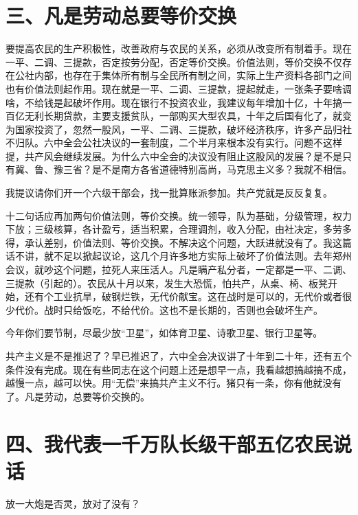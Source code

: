 \date{一九五九年三月一日}
\section{三、凡是劳动总要等价交换}

要提高农民的生产积极性，改善政府与农民的关系，必须从改变所有制着手。现在一平、二调、三提款，否定按劳分配，否定等价交换。价值法则，等价交换不仅存在公社内部，也存在于集体所有制与全民所有制之间，实际上生产资料各部门之间也有价值法则起作用。现在就是一平、二调、三提款，提起就走，一张条子要啥调啥，不给钱是起破坏作用。现在银行不投资农业，我建议每年增加十亿，十年搞一百亿无利长期贷款，主要支援贫队，一部购买大型农具，十年之后国有化了，就变为国家投资了，忽然一股风，一平、二调、三提款，破坏经济秩序，许多产品归社不归队。六中全会公社决议的一套制度，二个半月来根本没有实行。问题不这样提，共产风会继续发展。为什么六中全会的决议没有阻止这股风的发展？是不是只有冀、鲁、豫三省？是不是南方各省道德特别高尚，马克思主义多？我就不相信。

我提议请你们开一个六级干部会，找一批算账派参加。共产党就是反反复复。

十二句话应再加两句价值法则，等价交换。统一领导，队为基础，分级管理，权力下放；三级核算，各计盈亏，适当积累，合理调剂，收入分配，由社决定，多劳多得，承认差别，价值法则、等价交换。不解决这个问题，大跃进就没有了。我这篇话不讲，就不足以掀起议论，这几个月许多地方实际上破坏了价值法则。去年郑州会议，就吵这个问题，拉死人来压活人。凡是瞒产私分者，一定都是一平、二调、三提款（引起的）。农民从十月以来，发生大恐慌，怕共产，从桌、椅、板凳开始，还有个工业抗旱，破钢烂铁，无代价献宝。这在战时是可以的，无代价或者很少代价。战时只给饭吃，不给代价。这也不是长期的，否则也会破坏生产。

今年你们要节制，尽最少放“卫星”，如体育卫星、诗歌卫星、银行卫星等。

共产主义是不是推迟了？早已推迟了，六中全会决议讲了十年到二十年，还有五个条件没有完成。现在有些同志在这个问题上还是想早一点，我看越想搞越搞不成，越慢一点，越可以快。用“无偿”来搞共产主义不行。猪只有一条，你有他就没有了。凡是劳动，总要等价交换的。

\date{一九五九年三月五日}
\section{四、我代表一千万队长级干部五亿农民说话}

放一大炮是否灵，放对了没有？

